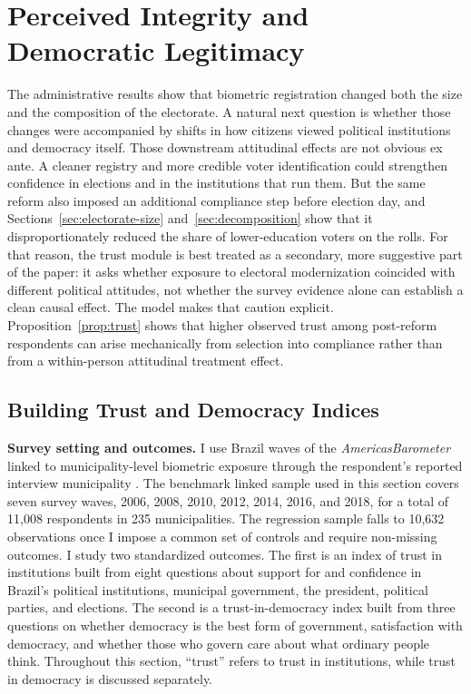 \section{Perceived Integrity and Democratic Legitimacy}
\label{sec:political-trust}

The administrative results show that biometric registration changed both the size and the composition of the electorate. A natural next question is whether those changes were accompanied by shifts in how citizens viewed political institutions and democracy itself. Those downstream attitudinal effects are not obvious ex ante. A cleaner registry and more credible voter identification could strengthen confidence in elections and in the institutions that run them. But the same reform also imposed an additional compliance step before election day, and Sections~\ref{sec:electorate-size} and~\ref{sec:decomposition} show that it disproportionately reduced the share of lower-education voters on the rolls. For that reason, the trust module is best treated as a secondary, more suggestive part of the paper: it asks whether exposure to electoral modernization coincided with different political attitudes, not whether the survey evidence alone can establish a clean causal effect. The model makes that caution explicit. Proposition~\ref{prop:trust} shows that higher observed trust among post-reform respondents can arise mechanically from selection into compliance rather than from a within-person attitudinal treatment effect.

\subsection{Building Trust and Democracy Indices}

\textbf{Survey setting and outcomes.} I use Brazil waves of the \LAPOP{} \textit{AmericasBarometer} linked to municipality-level biometric exposure through the respondent's reported interview municipality \citep{lapop_americasbarometer}. The benchmark linked sample used in this section covers seven survey waves, 2006, 2008, 2010, 2012, 2014, 2016, and 2018, for a total of 11{,}008 respondents in 235 municipalities. The regression sample falls to 10{,}632 observations once I impose a common set of controls and require non-missing outcomes. I study two standardized outcomes. The first is an index of trust in institutions built from eight questions about support for and confidence in Brazil's political institutions, municipal government, the president, political parties, and elections. The second is a trust-in-democracy index built from three questions on whether democracy is the best form of government, satisfaction with democracy, and whether those who govern care about what ordinary people think. Throughout this section, ``trust'' refers to trust in institutions, while trust in democracy is discussed separately.

